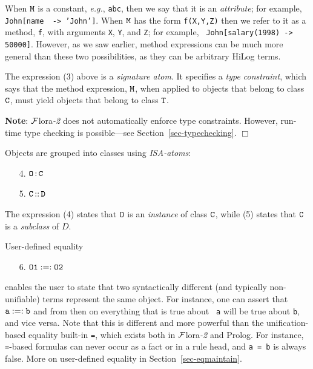 \documentclass[11pt]{article}
\newcommand{\isa}{\,{\bf{:}}\,}
\newcommand{\subcl}{\,{\bf{::}}\,}
\newcommand{\mvd}{{\mbox{\tt \,->\,}}}  %
\newcommand{\FLORA}{{\mbox{\sc ${\cal F}${lora}\rm\emph{-2}}}\xspace}
\newcommand{\fl}{\mbox{F-logic}\xspace}
\begin{document}
\begin{itemize}
  When $\tt M$ is a constant, {\it e.g.}, {\tt abc}, then we say that it is
  an \emph{attribute}; for example, {\tt John[name \mvd 'John']}. When $\tt
  M$ has the form {\tt f(X,Y,Z)} then we refer to it as a method, {\tt f},
  with arguments {\tt X}, {\tt Y}, and {\tt Z}; for example, {\tt
  John[salary(1998)\mvd 50000]}.  However, as we saw
  earlier, method expressions can be much more general than these two
  possibilities, as they can be arbitrary HiLog terms.


  \medskip

  \index{signature!in \fl}
  The expression (3) above is a \emph{signature atom}. It specifies a
  \emph{type constraint}, which says
  that the method expression, $\tt M$, when applied to objects that belong
  to class $\tt C$, must yield objects that belong to class $\tt T$.

  \noindent
  {\bf Note}: \FLORA does not automatically enforce type constraints.
  However, run-time type checking is possible---see
  Section~\ref{sec-typechecking}.
  \hfill$\Box$
  
  \medskip

  Objects are grouped into classes using \emph{ISA-atoms}:
  \medskip

  \begin{enumerate}
  \item[4.] $\tt O\isa C$
  \item[5.] \label{eq-subclass} $\tt C\subcl D$
  \end{enumerate}

  The expression (4) states that $\tt O$ is an \emph{instance} of class $\tt C$,
  while (5) states that $\tt C$ is a \emph{subclass} of $D$.

  User-defined equality
  \begin{enumerate}
    \item[6.] $\tt O1 :=: O2$
  \end{enumerate}
  enables the user to state that two syntactically different (and typically
  non-unifiable) terms represent the same object. For instance, one can
  assert that $\tt a :=: b$ and from then on everything that is true about {\tt
  a}  will be true about {\tt b}, and vice versa. Note that this is
  different and more powerful than the unification-based equality built-in
  {\tt =}, which exists both in \FLORA and Prolog. For instance, {\tt
  =}-based formulas can never occur as a fact or in a rule head, and {\tt a =
  b} is always false.  More on user-defined equality in
  Section~\ref{sec-eqmaintain}.


\end{itemize}
\end{document}
